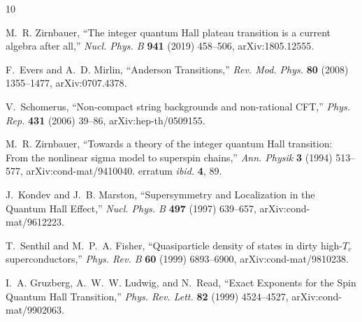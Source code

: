 \documentclass[12pt]{article}
\numberwithin{equation}{section}
\begin{document}
	
	\providecommand{\href}[2]{#2}\begingroup\raggedright\begin{thebibliography}{10}
		
		M.~R. Zirnbauer, ``{The integer quantum Hall plateau transition is a current
			algebra after all},''
		\href{http://dx.doi.org/10.1016/j.nuclphysb.2019.02.017}{{\em Nucl. Phys. B}
			{\bfseries 941} (2019) 458--506},
		\href{http://arxiv.org/abs/1805.12555}{{\ttfamily arXiv:1805.12555}}.
		
		F.~Evers and A.~D. Mirlin, ``{A}nderson {T}ransitions,''
		\href{http://dx.doi.org/10.1103/revmodphys.80.1355}{{\em Rev. Mod. Phys.}
			{\bfseries 80} (2008) 1355--1477},
		\href{http://arxiv.org/abs/0707.4378}{{\ttfamily arXiv:0707.4378}}.
		
		V.~Schomerus, ``Non-compact string backgrounds and non-rational {CFT},''
		\href{http://dx.doi.org/10.1016/j.physrep.2006.05.001}{{\em Phys. Rep.}
			{\bfseries 431} (2006) 39--86},
		\href{http://arxiv.org/abs/hep-th/0509155}{{\ttfamily arXiv:hep-th/0509155}}.
		
		M.~R. Zirnbauer, ``{T}owards a theory of the integer quantum {Hall} transition:
		{F}rom the nonlinear sigma model to superspin chains,''
		\href{http://dx.doi.org/10.1002/andp.19945060702}{{\em Ann. Physik}
			{\bfseries 3} (1994) 513--577},
		\href{http://arxiv.org/abs/cond-mat/9410040}{{\ttfamily
				arXiv:cond-mat/9410040}}. erratum \emph{ibid.} \textbf{4}, 89.
		
		J.~Kondev and J.~B. Marston, ``{S}upersymmetry and {L}ocalization in the
		{Q}uantum {H}all {E}ffect,''
		\href{http://dx.doi.org/https://doi.org/10.1016/S0550-3213(97)00300-3}{{\em
				Nucl. Phys. B} {\bfseries 497} (1997) 639--657},
		\href{http://arxiv.org/abs/cond-mat/9612223}{{\ttfamily
				arXiv:cond-mat/9612223}}.
		
		T.~Senthil and M.~P.~A. Fisher, ``{Q}uasiparticle density of states in dirty
		high-${T_c}$ superconductors,''
		\href{http://dx.doi.org/10.1103/PhysRevB.60.6893}{{\em Phys. Rev. B}
			{\bfseries 60} (1999) 6893--6900},
		\href{http://arxiv.org/abs/cond-mat/9810238}{{\ttfamily
				arXiv:cond-mat/9810238}}.
		
		I.~A. Gruzberg, A.~W.~W. Ludwig, and N.~Read, ``{E}xact {E}xponents for the
		{S}pin {Q}uantum {H}all {T}ransition,''
		\href{http://dx.doi.org/10.1103/PhysRevLett.82.4524}{{\em Phys. Rev. Lett.}
			{\bfseries 82} (1999) 4524--4527},
		\href{http://arxiv.org/abs/cond-mat/9902063}{{\ttfamily
				arXiv:cond-mat/9902063}}.
		

\end{thebibliography}
\end{document}
